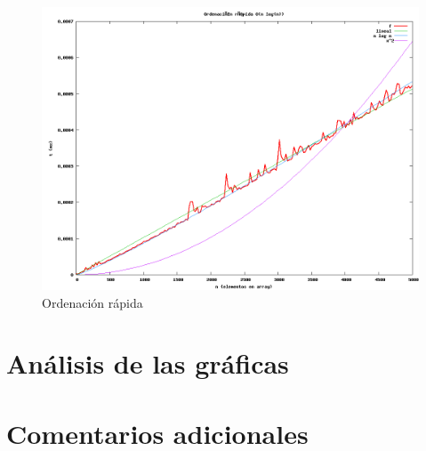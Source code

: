 \documentclass[11pt]{article}
\begin{document}
\begin{figure}
  \centering
    \includegraphics[width=1.0\textwidth]{quick-sort.png}
  \caption{Ordenación rápida}
  \label{fig:quick}
\end{figure}

\newpage
\section{Análisis de las gráficas}

\newpage
\section{Comentarios adicionales}
\end{document}
